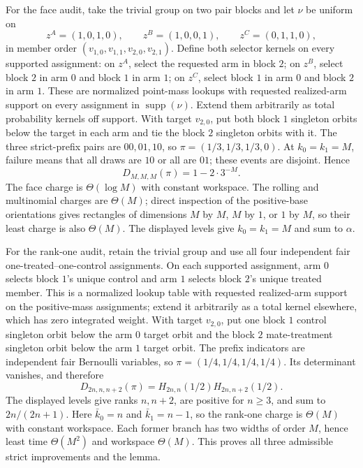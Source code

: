For the face audit, take the trivial group on two pair blocks and let \(\nu\) be uniform on
\[
z^A=(1,0,1,0),\qquad z^B=(1,0,0,1),\qquad z^C=(0,1,1,0),
\tag{8}
\]
in member order \((v_{1,0},v_{1,1},v_{2,0},v_{2,1})\). Define both selector kernels on every supported assignment: on \(z^A\), select the requested arm in block \(2\); on \(z^B\), select block \(2\) in arm \(0\) and block \(1\) in arm \(1\); on \(z^C\), select block \(1\) in arm \(0\) and block \(2\) in arm \(1\). These are normalized point-mass lookups with requested realized-arm support on every assignment in \(\operatorname{supp}(\nu)\). Extend them arbitrarily as total probability kernels off support. With target \(v_{2,0}\), put both block \(1\) singleton orbits below the target in each arm and tie the block \(2\) singleton orbits with it. The three strict-prefix pairs are \(00,01,10\), so \(\pi=(1/3,1/3,1/3,0)\). At \(k_0=k_1=M\), failure means that all draws are \(10\) or all are \(01\); these events are disjoint. Hence
\[
D_{M,M,M}(\pi)=1-2\cdot3^{-M}.
\]
The face charge is \(\Theta(\log M)\) with constant workspace. The rolling and multinomial charges are \(\Theta(M)\); direct inspection of the positive-base orientations gives rectangles of dimensions \(M\) by \(M\), \(M\) by \(1\), or \(1\) by \(M\), so their least charge is also \(\Theta(M)\). The displayed levels give \(k_0=k_1=M\) and sum to \(\alpha\).

For the rank-one audit, retain the trivial group and use all four independent fair one-treated--one-control assignments. On each supported assignment, arm \(0\) selects block \(1\)'s unique control and arm \(1\) selects block \(2\)'s unique treated member. This is a normalized lookup table with requested realized-arm support on the positive-mass assignments; extend it arbitrarily as a total kernel elsewhere, which has zero integrated weight. With target \(v_{2,0}\), put one block \(1\) control singleton orbit below the arm \(0\) target orbit and the block \(2\) mate-treatment singleton orbit below the arm \(1\) target orbit. The prefix indicators are independent fair Bernoulli variables, so \(\pi=(1/4,1/4,1/4,1/4)\). Its determinant vanishes, and therefore
\[
D_{2n,n,n+2}(\pi)=H_{2n,n}(1/2)H_{2n,n+2}(1/2).
\]
The displayed levels give ranks \(n,n+2\), are positive for \(n\ge3\), and sum to \(2n/(2n+1)\). Here \(\bar k_0=n\) and \(\bar k_1=n-1\), so the rank-one charge is \(\Theta(M)\) with constant workspace. Each former branch has two widths of order \(M\), hence least time \(\Theta(M^2)\) and workspace \(\Theta(M)\). This proves all three admissible strict improvements and the lemma.